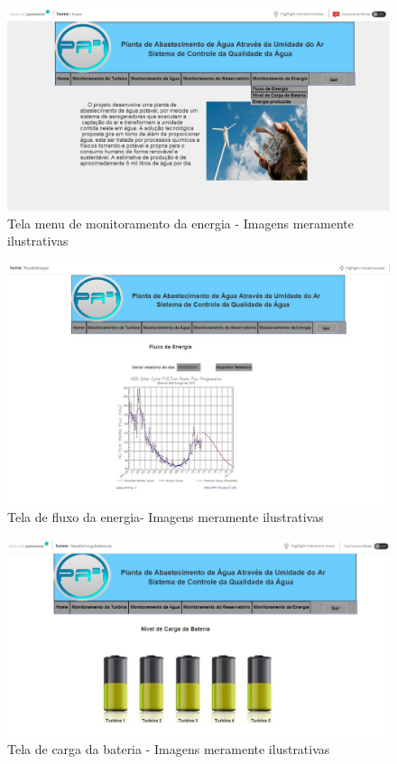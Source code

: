 \begin{center}
\begin{figure}[!ht]
\centering
\includegraphics[scale=0.5]{figuras/menu_monitoramento_da_energia}
\caption[Tela menu de monitoramento da energia]{Tela menu de monitoramento da energia - Imagens meramente ilustrativas}
\label{menu_monitoramento_da_energia}
\end{figure}
\clearpage

\begin{figure}[!ht]
\centering
\includegraphics[scale=0.5]{figuras/14}
\caption[Tela de fluxo da energia]{Tela de fluxo da energia- Imagens meramente ilustrativas}
\label{tela_fluxo_energia}
\end{figure}


\begin{figure}[!ht]
\centering
\includegraphics[scale=0.5]{figuras/15}
\caption[Tela de carga da bateria]{Tela de carga da bateria - Imagens meramente ilustrativas}
\label{tela_carga_bateria}
\end{figure}
\clearpage


\end{center}
